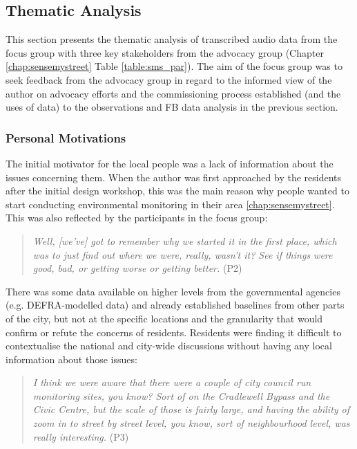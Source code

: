 \subsection{Thematic Analysis}
\label{sub:comm_ref}
This section presents the thematic analysis of transcribed audio data from the focus group with three key stakeholders from the advocacy group (Chapter \ref{chap:sensemystreet} Table \ref{table:sms_par}). The aim of the focus group was to seek feedback from the advocacy group in regard to the informed view of the author on advocacy efforts and the commissioning process established (and the uses of data) to the observations and FB data analysis in the previous section.

\subsubsection{Personal Motivations}
The initial motivator for the local people was a lack of information about the issues concerning them. When the author was first approached by the residents after the initial design workshop, this was the main reason why people wanted to start conducting environmental monitoring in their area \ref{chap:sensemystreet}. This was also reflected by the participants in the focus group:
\begin{quote}
    \textit{Well, [we've] got to remember why we started it in the first place, which was to just find out where we were, really, wasn't it? See if things were good, bad, or getting worse or getting better.} (P2)
\end{quote}

There was some data available on higher levels from the governmental agencies (e.g. DEFRA-modelled data) and already established baselines from other parts of the city, but not at the specific locations and the granularity that would confirm or refute the concerns of residents. Residents were finding it difficult to contextualise the national and city-wide discussions without having any local information about those issues:
\begin{quote}
    \textit{I think we were aware that there were a couple of city council run monitoring sites, you know? Sort of on the Cradlewell Bypass and the Civic Centre, but the scale of those is fairly large, and having the ability of zoom in to street by street level, you know, sort of neighbourhood level, was really interesting.} (P3)
\end{quote}


